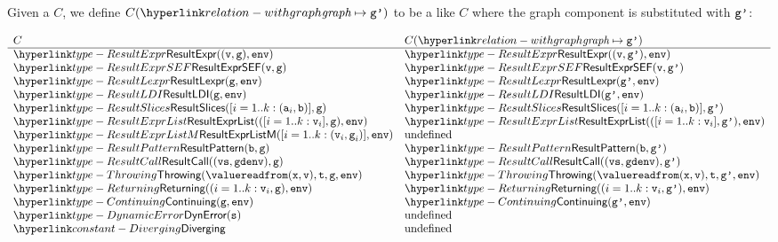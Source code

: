 \hypertarget{relation-withgraph}{}
Given a \semanticsconfigurationterm{} $C$, we define $\withgraph{C}{\vgp}$ to be a \semanticsconfigurationterm{}
like $C$ where the graph component is substituted with $\texttt{g'}$:
\begin{small}
\[
\begin{array}{ll}
  C & \withgraph{C}{\vgp}\\
  \hline
  \ResultExpr((\vv, \vg), \env) & \ResultExpr((\vv, \vgp), \env)\\
  \ResultExprSEF(\vv, \vg) & \ResultExprSEF(\vv, \vgp)\\
  \ResultLexpr(\vg, \env) & \ResultLexpr(\vgp, \env)\\
  \ResultLDI(\vg, \env) & \ResultLDI(\vgp, \env)\\
  \ResultSlices([i=1..k: (\va_i,\vb)], \vg) & \ResultSlices([i=1..k: (\va_i,\vb)], \vgp)\\
  \ResultExprList(([i=1..k: \vv_i], \vg), \env) & \ResultExprList(([i=1..k: \vv_i], \vgp), \env)\\
  \ResultExprListM([i=1..k: (\vv_i,\vg_i)], \env) & \text{undefined}\\
  \ResultPattern(\vb, \vg) & \ResultPattern(\vb, \vgp)\\
  \ResultCall((\vvs, \gdenv), \vg) & \ResultCall((\vvs, \gdenv), \vgp)\\
  \Throwing(\valuereadfrom(\vx,\vv),\vt,\vg, \env) & \Throwing(\valuereadfrom(\vx,\vv),\vt,\vgp, \env)\\
  \Returning((i=1..k: \vv_i,\vg), \env) & \Returning((i=1..k: \vv_i,\vgp), \env)\\
  \Continuing(\vg, \env) & \Continuing(\vgp, \env)\\
  \DynamicError(\vs) & \text{undefined}\\
  \Diverging & \text{undefined} \\
\end{array}
\]
\end{small}


